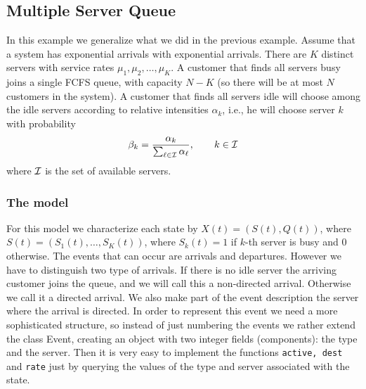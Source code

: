 \documentclass[11pt,letterpaper]{article}
\newcommand{\lstinclude}[2][]{
  \lstset{title={\Large{File #2}},basicstyle=\small}
  
}
\begin{document}
\subsection{Multiple Server Queue}
In this example we generalize what we did in the previous example.
Assume that a system has exponential arrivals with exponential
arrivals. There are $K$ distinct servers with service rates
$\mu_1, \mu_2, \ldots, \mu_K$. A customer that finds all servers
busy joins a single FCFS queue, with capacity $N-K$ (so there will
be at most $N$ customers in the system). A customer that finds all
servers idle will choose among the idle servers according to
relative intensities $\alpha_k$, i.e., he will choose server $k$
with probability
\[\beta_k = \frac{\alpha_k}{\sum_{\ell\in \cal I}\alpha_{\ell}}, \qquad k \in \cal I\]
where $\cal I$ is the set of available servers.

\subsubsection{The model}

For this model we characterize each state by $X(t)=(S(t), Q(t))$,
where $S(t)=(S_1(t), \ldots, S_K(t))$, where $S_k(t)= 1$ if $k$-th
server is busy and 0 otherwise. The events that can occur are
arrivals and departures. However we  have to distinguish two type
of arrivals. If there is no idle server the arriving customer
joins the queue, and we will call this a non-directed arrival.
Otherwise we call it a directed arrival. We also make part of the
event description the server where the arrival is directed. In
order to represent this event we need a more sophisticated
structure, so instead of just numbering the events we rather
extend the class Event, creating an object with two integer fields
(components): the type and the server. Then it is very easy to
implement the functions \texttt{active, dest} and \texttt{rate}
just by querying the values of the type and server associated with
the state.



\end{document}

